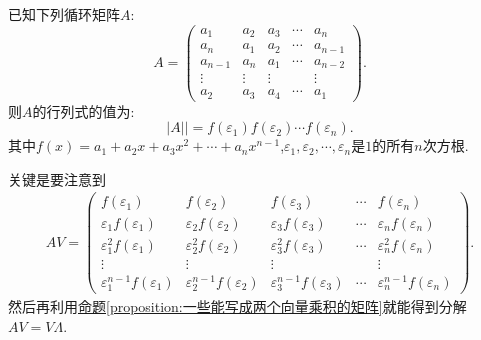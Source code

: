 \documentclass[lang=cn,newtx,10pt,scheme=chinese]{elegantbook}
\begin{document}
\begin{proposition}[循环行列式计算公式]\label{proposition:循环行列式计算公式}
    已知下列循环矩阵\(A\):
\[
A = 
\begin{pmatrix}
a_1 & a_2 & a_3 & \cdots & a_n\\
a_n & a_1 & a_2 & \cdots & a_{n - 1}\\
a_{n - 1} & a_n & a_1 & \cdots & a_{n - 2}\\
\vdots & \vdots & \vdots & & \vdots\\
a_2 & a_3 & a_4 & \cdots & a_1
\end{pmatrix}.
\]
则\(A\)的行列式的值为:
\[
|A|| = f(\varepsilon_1)f(\varepsilon_2)\cdots f(\varepsilon_n).
\]
其中\(f(x)=a_1 + a_2x + a_3x^2+\cdots+a_nx^{n - 1}\),\(\varepsilon_1,\varepsilon_2,\cdots,\varepsilon_n\)是\(1\)的所有\(n\)次方根.
\end{proposition}
\begin{note}
    关键是要注意到
    \begin{align*}
        AV = 
\begin{pmatrix}
f(\varepsilon_1) & f(\varepsilon_2) & f(\varepsilon_3) & \cdots & f(\varepsilon_n)\\
\varepsilon_1f(\varepsilon_1) & \varepsilon_2f(\varepsilon_2) & \varepsilon_3f(\varepsilon_3) & \cdots & \varepsilon_nf(\varepsilon_n)\\
\varepsilon_1^2f(\varepsilon_1) & \varepsilon_2^2f(\varepsilon_2) & \varepsilon_3^2f(\varepsilon_3) & \cdots & \varepsilon_n^2f(\varepsilon_n)\\
\vdots & \vdots & \vdots & & \vdots\\
\varepsilon_1^{n - 1}f(\varepsilon_1) & \varepsilon_2^{n - 1}f(\varepsilon_2) & \varepsilon_3^{n - 1}f(\varepsilon_3) & \cdots & \varepsilon_n^{n - 1}f(\varepsilon_n)
\end{pmatrix}.
    \end{align*}
然后再利用\hyperref[proposition:一些能写成两个向量乘积的矩阵]{命题\ref{proposition:一些能写成两个向量乘积的矩阵}}就能得到分解$AV = V\Lambda$.
\end{note}
\end{document}
